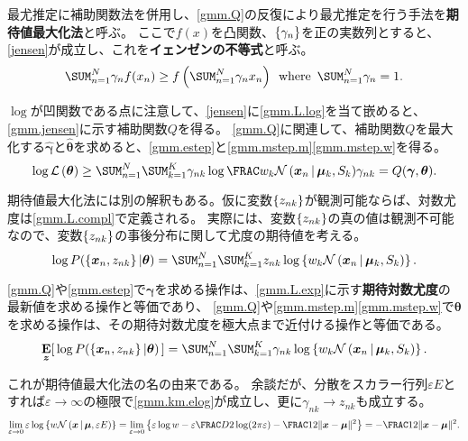 \documentclass[10pt,a4paper]{book}
\begin{document}
最尤推定に補助関数法を併用し、\eqref{gmm.Q}の反復により最尤推定を行う手法を\textbf{期待値最大化法}と呼ぶ。
ここで$f(x)$を凸関数、$\seq{\gamma_n}$を正の実数列とすると、\eqref{jensen}が成立し、これを\textbf{イェンゼンの不等式}と呼ぶ。
%
\begin{equation}
\label{eq:jensen}
\sum_{n=1}^N \gamma_n f(x_n) \geq f\left(\sum_{n=1}^N \gamma_n x_n\right) \where \sum_{n=1}^N \gamma_n=1.
\end{equation}

$\log$が凹関数である点に注意して、\eqref{jensen}に\eqref{gmm.L.log}を当て嵌めると、\eqref{gmm.jensen}に示す補助関数$Q$を得る。
\eqref{gmm.Q}に関連して、補助関数$Q$を最大化する$\hat{\bm{\gamma}}$と$\hat{\bm{\theta}}$を求めると、\eqref{gmm.estep}と\eqref{gmm.mstep.m}\eqref{gmm.mstep.w}を得る。
%
\begin{equation}
\label{eq:gmm.jensen}
\log \Lk{\bm{\theta}}
\geq \sum_{n=1}^N \sum_{k=1}^K \gamma_{nk} \log \frac{w_k \Nd{\bm{x}_n}{\bm{\mu}_k,S_k}}{\gamma_{nk}} = Q(\bm{\gamma}, \bm{\theta}).
\end{equation}

期待値最大化法には別の解釈もある。仮に変数$\seq{z_{nk}}$が観測可能ならば、対数尤度は\eqref{gmm.L.compl}で定義される。
実際には、変数$\seq{z_{nk}}$の真の値は観測不可能なので、変数$\seq{z_{nk}}$の事後分布に関して尤度の期待値を考える。
%
\begin{equation}
\label{eq:gmm.L.compl}
\log P(\seq{\bm{x}_n,z_{nk}}|\bm{\theta}) = \sum_{n=1}^N \sum_{k=1}^K z_{nk} \log \seq{w_k \Nd{\bm{x}_n}{\bm{\mu}_k,S_k}}.
\end{equation}

\eqref{gmm.Q}や\eqref{gmm.estep}で$\bm{\gamma}$を求める操作は、\eqref{gmm.L.exp}に示す\textbf{期待対数尤度}の最新値を求める操作と等価であり、
\eqref{gmm.Q}や\eqref{gmm.mstep.m}\eqref{gmm.mstep.w}で$\bm{\theta}$を求める操作は、その期待対数尤度を極大点まで近付ける操作と等価である。
%
\begin{equation}
\label{eq:gmm.L.exp}
\E[\bm{z}]{\log P(\seq{\bm{x}_n,z_{nk}}|\bm{\theta})} = \sum_{n=1}^N \sum_{k=1}^K \gamma_{nk} \log \seq{w_k \Nd{\bm{x}_n}{\bm{\mu}_k,S_k}}.
\end{equation}

これが期待値最大化法の名の由来である。
余談だが、分散をスカラー行列$\varepsilon E$とすれば$\varepsilon\!\to\!\infty$の極限で\eqref{gmm.km.elog}が成立し、更に$\gamma_{nk}\!\to\!z_{nk}$も成立する。
%
\begin{equation}
\label{eq:gmm.km.elog}
\lim_{\varepsilon\to0} \varepsilon\log \seq{w \Nd{\bm{x}}{\bm{\mu},\varepsilon E}} =
\lim_{\varepsilon\to0} \seq{\varepsilon\log w - \varepsilon\frac{D}{2} \log (2\pi\varepsilon) - \frac{1}{2} \|\bm{x}-\bm{\mu}\|^2} =
-\frac{1}{2} \|\bm{x}-\bm{\mu}\|^2.
\end{equation}
\end{document}
